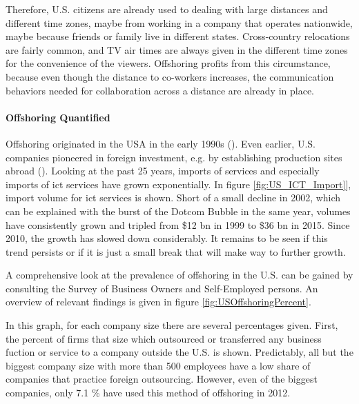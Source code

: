 Therefore, U.S. citizens are already used to dealing with large distances and different time zones, maybe from working in a company that operates nationwide, maybe because friends or family live in different states. Cross-country relocations are fairly common, and TV air times are always given in the different time zones for the convenience of the viewers. Offshoring profits from this circumstance, because even though the distance to co-workers increases, the communication behaviors needed for collaboration across a distance are already in place.





\paragraph{Offshoring Quantified}
Offshoring originated in the USA in the early 1990s (\cite[p. 389]{Pisani.2016}). Even earlier, U.S. companies pioneered in foreign investment, e.g. by establishing production sites abroad (\cite[p. 5]{Kozlow.2006}). Looking at the past 25 years, imports of services and especially imports of \gls{ict} services have grown exponentially. In figure \ref{fig:US_ICT_Import}], import volume for \gls{ict} services is shown. Short of a small decline in 2002, which can be explained with the burst of the Dotcom Bubble in the same year, volumes have consistently grown and tripled from \$12 bn in 1999 to \$36 bn in 2015. Since 2010, the growth has slowed down considerably. It remains to be seen if this trend persists or if it is just a small break that will make way to further growth.


A comprehensive look at the prevalence of offshoring in the U.S. can be gained by consulting the Survey of Business Owners and Self-Employed persons. An overview of relevant findings is given in figure \ref{fig:USOffshoringPercent}.

In this graph, for each company size there are several percentages given. First, the percent of firms that size which outsourced or transferred any business fuction or service to a company outside the U.S. is shown. Predictably, all but the biggest company size with more than 500 employees have a low share of companies that practice foreign outsourcing. However, even of the biggest companies, only 7.1 \% have used this method of offshoring in 2012.

